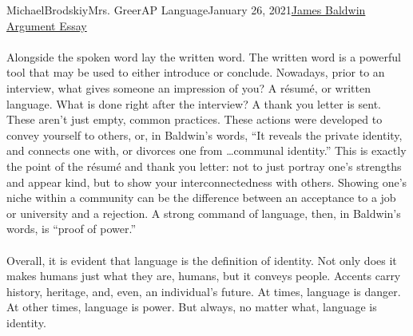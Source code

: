 \documentclass[12pt,letterpaper]{article}
\begin{document}
\begin{mla}{Michael}{Brodskiy}{Mrs. Greer}{AP Language}{January 26, 2021}{\underline{James Baldwin Argument Essay}}
\begin{justify}
  \end{justify}

  \begin{justify}

    \paragraph{} Alongside the spoken word lay the written word. The written word is a powerful tool that may be used to either introduce or conclude. Nowadays, prior to an interview, what gives someone an impression of you? A r\'esum\'e, or written language. What is done right after the interview? A thank you letter is sent. These aren't just empty, common practices. These actions were developed to convey yourself to others, or, in Baldwin's words, ``It reveals the private identity, and connects one with, or divorces one from \ldots communal identity.'' This is exactly the point of the r\'esum\'e and thank you letter: not to just portray one's strengths and appear kind, but to show your interconnectedness with others. Showing one's niche within a community can be the difference between an acceptance to a job or university and a rejection. A strong command of language, then, in Baldwin's words, is ``proof of power.''\\

  \end{justify}

  \begin{justify}

    \paragraph{} Overall, it is evident that language is the definition of identity. Not only does it makes humans just what they are, humans, but it conveys people. Accents carry history, heritage, and, even, an individual's future. At times, language is danger. At other times, language is power. But always, no matter what, language is identity.\\

  \end{justify}


\end{mla}
\end{document}

